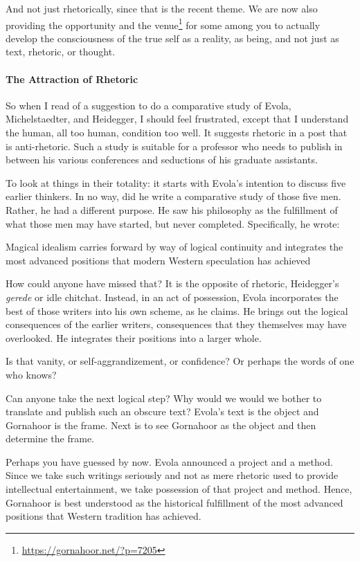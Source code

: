And not just rhetorically, since that is the recent theme. We are now also providing the opportunity and the venue\footnote{\url{https://gornahoor.net/?p=7205}} for some among you to actually develop the consciousness of the true self as a reality, as being, and not just as text, rhetoric, or thought.

\paragraph{The Attraction of Rhetoric}


So when I read of a suggestion to do a comparative study of Evola, Michelstaedter, and Heidegger, I should feel frustrated, except that I understand the human, all too human, condition too well. It suggests rhetoric in a post that is anti-rhetoric. Such a study is suitable for a professor who needs to publish in between his various conferences and seductions of his graduate assistants.

To look at things in their totality: it starts with Evola's intention to discuss five earlier thinkers. In no way, did he write a comparative study of those five men. Rather, he had a different purpose. He saw his philosophy as the fulfillment of what those men may have started, but never completed. Specifically, he wrote:

\begin{quotex} 
Magical idealism carries forward by way of logical continuity and integrates the most advanced positions that modern Western speculation has achieved
\end{quotex}


How could anyone have missed that? It is the opposite of rhetoric, Heidegger's \emph{gerede} or idle chitchat. Instead, in an act of possession, Evola incorporates the best of those writers into his own scheme, as he claims. He brings out the logical consequences of the earlier writers, consequences that they themselves may have overlooked. He integrates their positions into a larger whole.

Is that vanity, or self-aggrandizement, or confidence? Or perhaps the words of one who knows?

Can anyone take the next logical step? Why would we would we bother to translate and publish such an obscure text? Evola's text is the object and Gornahoor is the frame. Next is to see Gornahoor as the object and then determine the frame.

Perhaps you have guessed by now. Evola announced a project and a method. Since we take such writings seriously and not as mere rhetoric used to provide intellectual entertainment, we take possession of that project and method. Hence, Gornahoor is best understood as the historical fulfillment of the most advanced positions that Western tradition has achieved.

